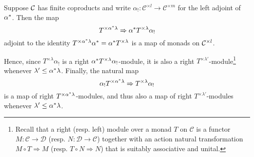 \documentclass[a4paper,10pt]{article}%
\begin{document}
\begin{proposition}\label{MONADICFUN PROP}
	Suppose $\mathcal{C}$ has finite coproducts and write
	$\alpha_{!} \colon \mathcal{C}^{\times l} \to 
	\mathcal{C}^{\times m}$
	for the left adjoint of $\alpha^{\**}$. 
	Then the map
\begin{equation}\label{MONADFUNCTORALPHA EQ}
	T^{\times \alpha^{\**} \lambda} \Rightarrow \alpha^{\**} T^{\times \lambda} \alpha_{!}
\end{equation}
adjoint to the identity 
$T^{\times \alpha^{\**}\lambda} \alpha^{\**} =
\alpha^{\**} T^{\times \lambda}$
is a map of monads on $\mathcal{C}^{\times l}$.

Hence, since $T^{\times \lambda} \alpha_!$ is a right 
$\alpha^{\**} T^{\times \lambda}\alpha_{!}$-module, 
it is also a right $T^{\times \lambda'}$-module\footnote{
Recall that a right (resp. left) module
over a monad $T$ on $\mathcal{C}$
is a functor $M \colon \mathcal{C} \to \mathcal{D}$
(resp. $N \colon \mathcal{D} \to \mathcal{C}$)
together with an action natural transformation
$M \circ T \Rightarrow M$
(resp. $T \circ N \Rightarrow N$)
that is suitably associative and unital.}
whenever
$\lambda' \leq \alpha^{\**} \lambda$.
Finally, the natural map 
\begin{equation}\label{MONADFUNCTORALPHADOU EQ}
	\alpha_{!} T^{\times \alpha^{\**} \lambda} \Rightarrow  T^{\times \lambda} \alpha_{!}
\end{equation}
is a map of right $T^{\times \alpha^{\**} \lambda}$-modules, 
and thus also a map of right 
$T^{\times \lambda'}$-modules
whenever $\lambda' \leq \alpha^{\**} \lambda$.
\end{proposition}

\end{document}

